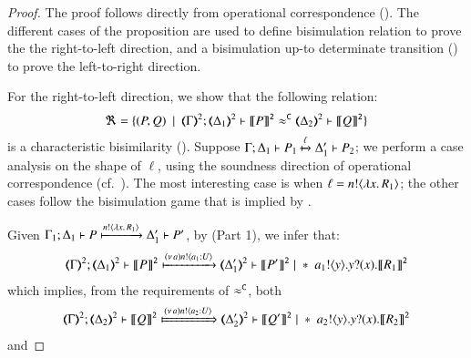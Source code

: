 \begin{proof}

%
	The proof follows directly from operational correspondence ().
	The different cases of the proposition are used to define
	bisimulation relation to prove the the right-to-left direction, and
	a bisimulation up-to determinate transition
	()
	to prove the
	left-to-right direction.

\bigskip

	\noi For the right-to-left direction, we show that the following relation:
	\[
		\Re = \set{
		(P,Q)
		\setbar \horel{\mapt{\Gamma}^{2}}{\mapt{\Delta_1}^2}{\pmap{P}{2}}{\fwb}{\mapt{\Delta_2}^2}{\pmap{Q}{2}}}
	\]
%
is a characteristic bisimilarity ().
%
Suppose $\Gamma; \Delta_1 \vdash P_1 \xmapsto{\ell} \Delta_1' \vdash P_2$; 
we perform a case analysis on the shape of ${\ell}$, using 
the soundness direction of operational correspondence (cf.~).
		The  most interesting case is when $\ell = n ! \langle \lambda x.\,R_1 \rangle$; the other cases follow
	the bisimulation game that is implied by .

	\noi Given $\Gamma_1; \Delta_1 \vdash P \xmapsto{n !\langle \lambda x.\,R_1 \rangle} \Delta_1' \vdash P'$, by 
 (Part 1), we  infer that:
%
	\begin{eqnarray*}
		\mapt{\Gamma}^{2}; \mapt{\Delta_1}^{2} \proves \pmap{P}{2} \hby{\news{a} \bactout{n}{a_1: U}} \mapt{\Delta_1'}^{2} \proves \pmap{P'}{2} \Par \repl{\bout{a_1}{y} \binp{y}{x} \pmap{R_1}{2}}
	\end{eqnarray*}
%
	which implies, from the requirements of $\approx^\mathtt{C}$, both 
%
	\begin{eqnarray}
		\label{prop:fa_ho_sessp_1}
		\mapt{\Gamma}^{2}; \mapt{\Delta_2}^{2} \proves \pmap{Q}{2} \Hby{\news{a} \bactout{n}{a_2: U}} \mapt{\Delta_2'}^{2} \proves \pmap{Q'}{2} \Par \repl{\bout{a_2}{y} \binp{y}{x} \pmap{R_2}{2}}
	\end{eqnarray}
%
	and


\end{proof}
